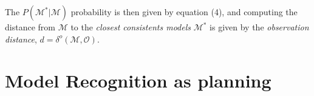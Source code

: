 \documentclass[letterpaper]{article} %
\newcommand{\strips}{\textsc{Strips}}     %
\begin{document}
The $P(\mathcal{M^*}|\mathcal{M})$ probability is then given by equation (4), and computing the distance from $\mathcal{M}$ to the {\em closest consistents models} $\mathcal{M^*}$ is given by the {\em observation distance}, $d=\delta^o(\mathcal{M},\mathcal{O})$.




%
%



\section{Model Recognition as planning}
\end{document}
